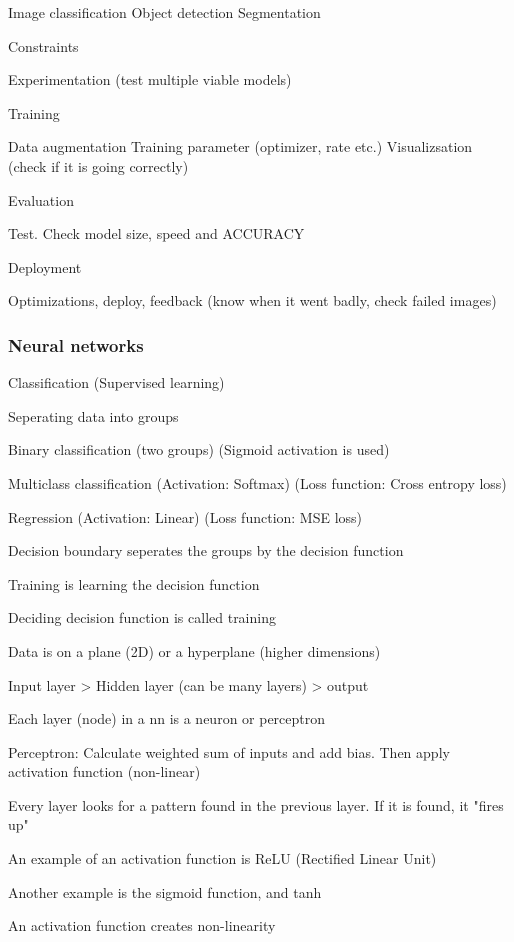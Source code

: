 	Image classification
	Object detection 
	Segmentation

	Constraints

	Experimentation (test multiple viable models)

Training

	Data augmentation
	Training parameter (optimizer, rate etc.)
	Visualizsation (check if it is going correctly)

Evaluation
	
	Test. Check model size, speed and ACCURACY

Deployment

	Optimizations, deploy, feedback (know when it went badly, check failed images)	

\subsubsection{Neural networks}

Classification (Supervised learning)

	Seperating data into groups

	Binary classification (two groups) (Sigmoid activation is used)

	Multiclass classification (Activation: Softmax) (Loss function: Cross entropy loss)

	Regression (Activation: Linear) (Loss function: MSE loss)

	Decision boundary seperates the groups by the decision function

	Training is learning the decision function

	Deciding decision function is called training

	Data is on a plane (2D) or a hyperplane (higher dimensions)

	Input layer > Hidden layer (can be many layers) > output

	Each layer (node) in a nn is a neuron or perceptron

	Perceptron: Calculate weighted sum of inputs and add bias. Then apply activation function (non-linear)

	Every layer looks for a pattern found in the previous layer. If it is found, it "fires up"

	An example of an activation function is ReLU (Rectified Linear Unit)

	Another example is the sigmoid function, and tanh

	An activation function creates non-linearity


